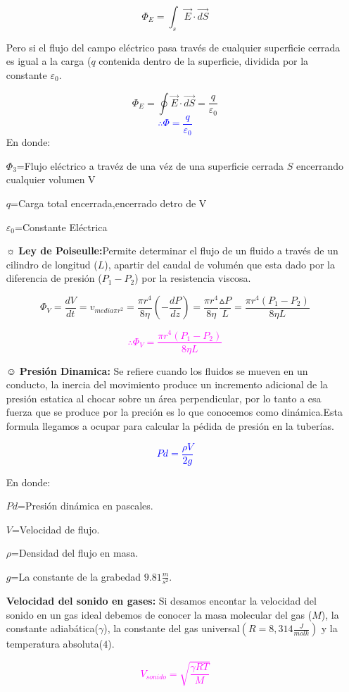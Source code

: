\documentclass[letterpaper,12pt]{article}
\begin{document}
\begin{itemize}
    $$\Phi_E=\int_{s} \vec{E}\cdot \vec{dS}$$
     
     Pero si el  flujo del campo eléctrico pasa través de cualquier superficie cerrada es igual a la carga ($q$ contenida dentro de la superficie, dividida por la constante $\varepsilon _{0}$.
     
     $$\Phi_E=\oint \vec{E}\cdot \vec{dS}=\frac{q}{\varepsilon _{0}}$$
     {\textcolor{blue}{$$\therefore \Phi=\frac{q}{\varepsilon _{0}}$$}}
     En donde:
     
     $\Phi_3$=Flujo eléctrico a travéz de una véz de una superficie cerrada $S$ encerrando cualquier volumen V
     
     $q$=Carga total encerrada,encerrado  detro de V
     
     ${\varepsilon _{0}}$=Constante Eléctrica
     
     \item[$\sun$]{\textbf {Ley de Poiseulle:}}Permite determinar el flujo de un fluido a través de un cilindro de longitud ($L$), apartir del caudal de volumén que esta dado por la diferencia de presión ($P_1-P_2$) por la resistencia viscosa.
     
     $$\Phi_V=\frac{dV}{dt}=v_{media \pi r^{2}}=\frac{\pi r^{4}}{8\eta}\left(-\frac{dP}{dz}\right)=\frac{\pi r^{4}}{8\eta}\frac{\vartriangle P}{L}=\frac{\pi r^{4}  (P_1-P_2)}{8\eta L}$$
     
     {\textcolor{magenta}{$$\therefore \Phi_V=\frac{\pi r^{4}  (P_1-P_2)}{8\eta L}$$}}
     
     \item[$\smiley$]{\textbf {Presión Dinamica:}} Se refiere cuando los fluidos se mueven en un conducto, la inercia del movimiento  produce un incremento adicional de la presión estatica al chocar sobre un área perpendicular, por lo tanto a esa fuerza que se produce por la preción es lo que conocemos como dinámica.Esta formula llegamos a ocupar para calcular la pédida  de presión en la tuberías.
     
     \textcolor{blue}{$${Pd=\frac{\rho V}{2g}}$$}
     
     En donde:
     
    $Pd$=Presión dinámica en pascales.
    
    $V$=Velocidad de flujo.
    
    $\rho$=Densidad del flujo en masa.
    
    $g$=La constante de la grabedad $9.81\frac{m}{s^{2}}$.
    
    \item[\textmusicalnote]{\textbf {Velocidad del sonido en gases:}} Si desamos encontar la velocidad del sonido en un gas ideal debemos de conocer la masa molecular del gas ($M$), la constante adiabática($\gamma$), la constante del gas universal$\left(R=8,314\frac{J}{molk}\right)$ y la temperatura absoluta($4$).
    
     \textcolor{Magenta}{$${V_{sonido}=\sqrt{\frac{ \gamma RT}{M}}}$$}
    
     
  \end{itemize} 
\end{document}
